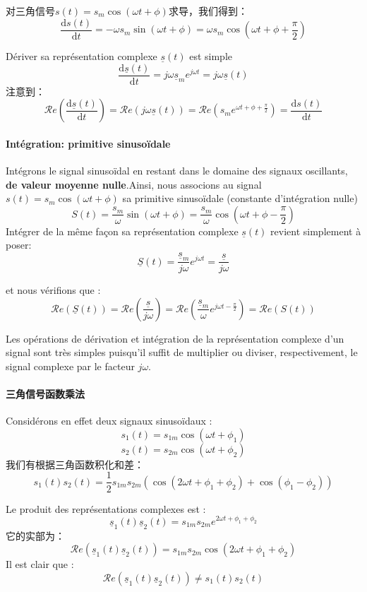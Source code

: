 \documentclass[12pt]{book}
\theoremstyle{definition}\newtheorem{dfn}{Définition}[chapter]
\theoremstyle{plain}\newtheorem{thm}{Théorème}[chapter]
\theoremstyle{plain}\newtheorem{prp}{Proposition}[chapter]
\theoremstyle{plain}\newtheorem{lem}{\bf Lemme}[chapter]
\theoremstyle{plain}\newtheorem{axm}{\bf Axiome}[chapter]
\theoremstyle{plain}\newtheorem{lmm}{\bf Lemme}[chapter]
\theoremstyle{plain}\newtheorem{cor}{\bf Corollaire}[chapter]
\theoremstyle{remark}\newtheorem{rem}{Remarque}[chapter]
\begin{document}
对三角信号$s(t)=s_m\cos(\omega t + \phi)$求导，我们得到：
$$
\frac{\mathrm{d} s(t)}{\mathrm{d}t}=-\omega s_m\sin (\omega t + \phi)=\omega s_m\cos (\omega t + \phi+\frac{\pi}{2})
$$

Dériver sa représentation complexe $\underline{s}(t)$ est simple
$$
\frac{\mathrm{d} \underline{s}(t)}{\mathrm{d}t}=j\omega\underline{s}_me^{j\omega t}=j\omega\underline{s}(t)
$$
注意到：
$$
\mathcal{R}e(\frac{\mathrm{d} \underline{s}(t)}{\mathrm{d}t})=\mathcal{R}e(j\omega\underline{s}(t))=\mathcal{R}e(s_me^{\omega t +\phi+\frac{\pi}{2}})=\frac{\mathrm{d} s(t)}{\mathrm{d}t}
$$

\paragraph{Intégration: primitive sinusoïdale}Intégrons le signal sinusoïdal en restant dans le domaine des signaux oscillants, \textbf{de
valeur moyenne nulle}.Ainsi, nous associons au signal $s(t)=s_m\cos(\omega t + \phi)$
sa primitive sinusoïdale (constante d'intégration nulle)
$$
S(t)=\frac{s_m}{\omega}\sin(\omega t+\phi)=\frac{s_m}{\omega}\cos(\omega t +\phi-\frac{\pi}{2})
$$
Intégrer de la même façon sa représentation complexe $\underline{s}(t)$ revient simplement
à poser:
$$
\underline{S}(t)=\frac{\underline{s}_m}{j\omega}e^{j\omega t}=\frac{\underline{s}}{j\omega}
$$

et nous vérifions que :
$$
\mathcal{R}e(\underline{S}(t))=\mathcal{R}e(\frac{\underline{s}}{j\omega})=\mathcal{R}e(\frac{\underline{s}_m}{\omega}e^{j\omega t-\frac{\pi}{2}})=\mathcal{R}e(S(t))
$$

Les opérations de dérivation et intégration de la représentation complexe
d'un signal sont très simples puisqu'il suffit de multiplier ou diviser,
respectivement, le signal complexe par le facteur $j\omega$.

\paragraph{三角信号函数乘法}Considérons en effet deux signaux
sinusoïdaux :
$$
s_1(t)=s_{1m}\cos(\omega t +\phi_{1})
$$
$$
s_2(t)=s_{2m}\cos(\omega t +\phi_{2})
$$
我们有根据三角函数积化和差：
$$
s_1(t)s_2(t)=\frac{1}{2}s_{1m}s_{2m}(\cos(2\omega t +\phi_{1}+\phi_{2})+\cos(\phi_{1}-\phi_{2}))
$$

Le produit des représentations
complexes est :
$$
\underline{s}_1(t)\underline{s}_2(t)=s_{1m}s_{2m}e^{2\omega t +\phi_{1}+\phi_{2}}
$$
它的实部为：
$$
\mathcal{R}e(\underline{s}_1(t)\underline{s}_2(t))=
s_{1m}s_{2m}\cos(2\omega t +\phi_{1}+\phi_{2}) 
$$
Il est clair que :
$$
\mathcal{R}e(\underline{s}_1(t)\underline{s}_2(t))\not =
s_1(t)s_2(t)
$$
\end{document}
